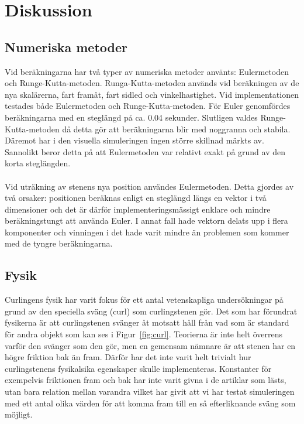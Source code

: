 \documentclass[11pt]{article} %
\begin{document}
\section{Diskussion}

\subsection{Numeriska metoder}
Vid beräkningarna har två typer av numeriska metoder använts: Eulermetoden och Runge-Kutta-metoden. Runga-Kutta-metoden används vid beräkningen av de nya skalärerna, fart framåt, fart sidled och vinkelhastighet.
Vid implementationen testades både Eulermetoden och Runge-Kutta-metoden. 
För Euler genomfördes beräkningarna med en steglängd på ca. 0.04 sekunder. 
Slutligen valdes Runge-Kutta-metoden då detta gör att beräkningarna blir med noggranna och stabila. 
Däremot har i den visuella simuleringen ingen större skillnad märkts av. Sannolikt beror detta på att Eulermetoden var relativt exakt på grund av den korta steglängden. 
\\\\Vid uträkning av stenens nya position användes Eulermetoden. 
Detta gjordes av två orsaker: positionen beräknas enligt en steglängd längs en vektor i två dimensioner och det är därför implementeringsmässigt enklare och mindre beräkningstungt att använda Euler. 
I annat fall hade vektorn delats upp i flera komponenter och vinningen i det hade varit mindre än problemen som kommer med de tyngre beräkningarna. 

\subsection{Fysik}
Curlingens fysik har varit fokus för ett antal vetenskapliga undersökningar på grund av den speciella sväng (curl) som curlingstenen gör. Det som har förundrat fysikerna är att curlingstenen svänger åt motsatt håll från vad som är standard för andra objekt som kan ses i Figur~\ref{fig:curl}. Teorierna är inte helt överrens varför den svänger som den gör, men en gemensam nämnare är att stenen har en högre friktion bak än fram. Därför har det inte varit helt trivialt hur curlingstenens fysikalsika egenskaper skulle implementeras. Konstanter för exempelvis friktionen fram och bak har inte varit givna i de artiklar som lästs, utan bara relation mellan varandra vilket har givit att vi har testat simuleringen med ett antal olika värden för att komma fram till en så efterliknande sväng som möjligt.
\end{document}
